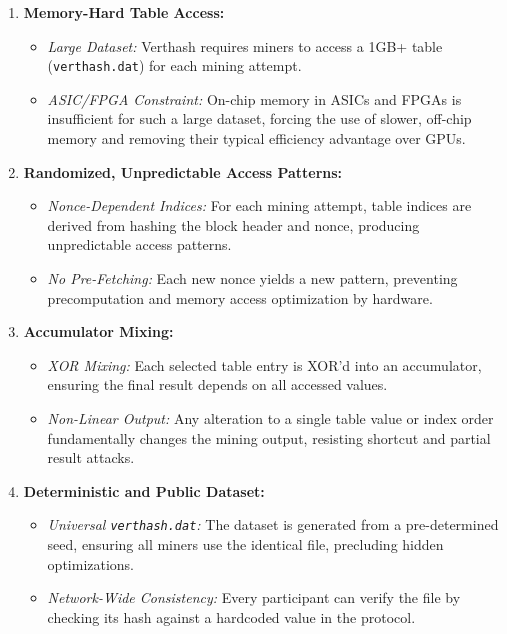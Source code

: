 \documentclass[12pt]{article}
\begin{document}
\begin{enumerate}
    \item \textbf{Memory-Hard Table Access:}
    \begin{itemize}
        \item \emph{Large Dataset:} Verthash requires miners to access a 1GB+ table (\texttt{verthash.dat}) for each mining attempt.
        \item \emph{ASIC/FPGA Constraint:} On-chip memory in ASICs and FPGAs is insufficient for such a large dataset, forcing the use of slower, off-chip memory and removing their typical efficiency advantage over GPUs.
    \end{itemize}

    \item \textbf{Randomized, Unpredictable Access Patterns:}
    \begin{itemize}
        \item \emph{Nonce-Dependent Indices:} For each mining attempt, table indices are derived from hashing the block header and nonce, producing unpredictable access patterns.
        \item \emph{No Pre-Fetching:} Each new nonce yields a new pattern, preventing precomputation and memory access optimization by hardware.
    \end{itemize}

    \item \textbf{Accumulator Mixing:}
    \begin{itemize}
        \item \emph{XOR Mixing:} Each selected table entry is XOR’d into an accumulator, ensuring the final result depends on all accessed values.
        \item \emph{Non-Linear Output:} Any alteration to a single table value or index order fundamentally changes the mining output, resisting shortcut and partial result attacks.
    \end{itemize}

    \item \textbf{Deterministic and Public Dataset:}
    \begin{itemize}
        \item \emph{Universal \texttt{verthash.dat}:} The dataset is generated from a pre-determined seed, ensuring all miners use the identical file, precluding hidden optimizations.
        \item \emph{Network-Wide Consistency:} Every participant can verify the file by checking its hash against a hardcoded value in the protocol.
    \end{itemize}


\end{enumerate}
\end{document}
